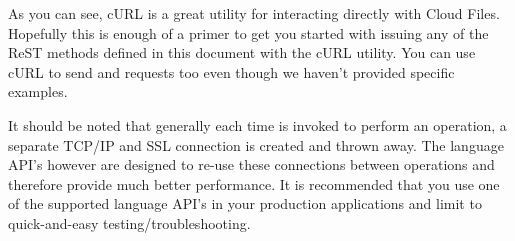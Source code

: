 \documentclass[letterpaper,10pt,english]{manual}
\begin{document}
As you can see, cURL is a great utility for interacting directly with
Cloud Files.  Hopefully this is enough of a primer to get you started
with issuing any of the ReST methods defined in this document with the
cURL utility.  You can use cURL to send  and  requests
too even though we haven't provided specific examples.

It should be noted that generally each time  is invoked to
perform an operation, a separate TCP/IP and SSL connection is created
and thrown away.  The language API's however are designed to re-use
these connections between operations and therefore provide much better
performance.  It is recommended that you use one of the supported
language API's in your production applications and limit  to
quick-and-easy testing/troubleshooting.
\end{document}
